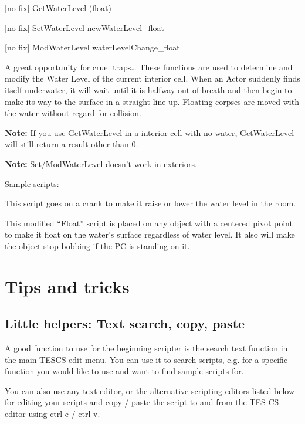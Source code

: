 \documentclass[
]{article}
\begin{document}
{[}no fix{]} GetWaterLevel (float)

{[}no fix{]} SetWaterLevel newWaterLevel\_float

{[}no fix{]} ModWaterLevel waterLevelChange\_float

A great opportunity for cruel traps\ldots{} These functions are used to
determine and modify the Water Level of the current interior cell. When
an Actor suddenly finds itself underwater, it will wait until it is
halfway out of breath and then begin to make its way to the surface in a
straight line up. Floating corpses are moved with the water without
regard for collision.

\textbf{Note:} If you use GetWaterLevel in a interior cell with no
water, GetWaterLevel will still return a result other than 0.

\textbf{Note:} Set/ModWaterLevel doesn't work in exteriors.

Sample scripts:

This script goes on a crank to make it raise or lower the water level in
the room.



This modified ``Float'' script is placed on any object with a centered
pivot point to make it float on the water's surface regardless of water
level. It also will make the object stop bobbing if the PC is standing
on it.



\hypertarget{tips-and-tricks}{%
\section{\texorpdfstring{\hfill\break
Tips and tricks}{ Tips and tricks}}\label{tips-and-tricks}}

\hypertarget{little-helpers-text-search-copy-paste}{%
\subsection{Little helpers: Text search, copy,
paste}\label{little-helpers-text-search-copy-paste}}

A good function to use for the beginning scripter is the search text
function in the main TESCS edit menu. You can use it to search scripts,
e.g. for a specific function you would like to use and want to find
sample scripts for.

You can also use any text-editor, or the alternative scripting editors
listed below for editing your scripts and copy / paste the script to and
from the TES CS editor using ctrl-c / ctrl-v.
\end{document}
